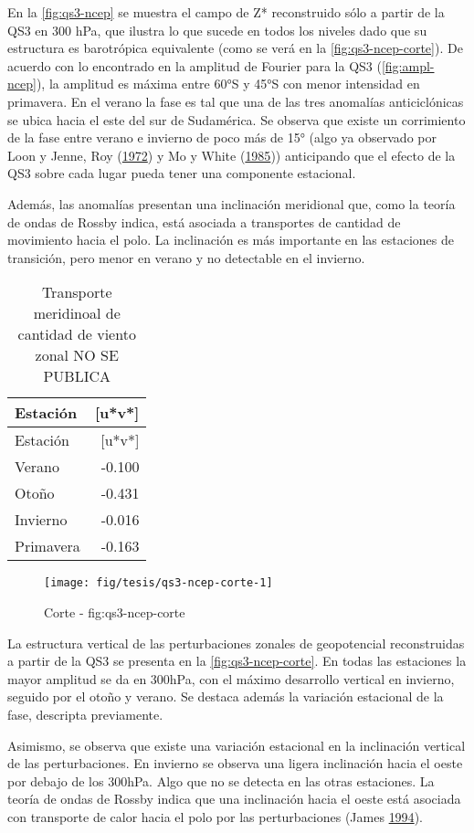 \documentclass[spanish,a4paper]{book}
\begin{document}
En la \autoref{fig:qs3-ncep} se muestra el campo de Z* reconstruido sólo
a partir de la QS3 en 300 hPa, que ilustra lo que sucede en todos los
niveles dado que su estructura es barotrópica equivalente (como se verá
en la \autoref{fig:qs3-ncep-corte}). De acuerdo con lo encontrado en la
amplitud de Fourier para la QS3 (\autoref{fig:ampl-ncep}), la amplitud
es máxima entre 60°S y 45°S con menor intensidad en primavera. En el
verano la fase es tal que una de las tres anomalías anticiclónicas se
ubica hacia el este del sur de Sudamérica. Se observa que existe un
corrimiento de la fase entre verano e invierno de poco más de 15° (algo
ya observado por Loon y Jenne, Roy
(\protect\hyperlink{ref-Loon1972}{1972}) y Mo y White
(\protect\hyperlink{ref-Mo1985}{1985})) anticipando que el efecto de la
QS3 sobre cada lugar pueda tener una componente estacional.

Además, las anomalías presentan una inclinación meridional que, como la
teoría de ondas de Rossby indica, está asociada a transportes de
cantidad de movimiento hacia el polo. La inclinación es más importante
en las estaciones de transición, pero menor en verano y no detectable en
el invierno.

\begin{longtable}[]{@{}lr@{}}
\caption{Transporte meridinoal de cantidad de viento zonal NO SE
PUBLICA}\tabularnewline
\toprule
Estación & {[}u*v*{]}\tabularnewline
\midrule
\endfirsthead
\toprule
Estación & {[}u*v*{]}\tabularnewline
\midrule
\endhead
Verano & -0.100\tabularnewline
Otoño & -0.431\tabularnewline
Invierno & -0.016\tabularnewline
Primavera & -0.163\tabularnewline
\bottomrule
\end{longtable}

\begin{figure*}
\texttt{[image: fig/tesis/qs3-ncep-corte-1]} \caption{Corte - fig:qs3-ncep-corte}\label{fig:qs3-ncep-corte}
\end{figure*}

La estructura vertical de las perturbaciones zonales de geopotencial
reconstruidas a partir de la QS3 se presenta en la
\autoref{fig:qs3-ncep-corte}. En todas las estaciones la mayor amplitud
se da en 300hPa, con el máximo desarrollo vertical en invierno, seguido
por el otoño y verano. Se destaca además la variación estacional de la
fase, descripta previamente.

Asimismo, se observa que existe una variación estacional en la
inclinación vertical de las perturbaciones. En invierno se observa una
ligera inclinación hacia el oeste por debajo de los 300hPa. Algo que no
se detecta en las otras estaciones. La teoría de ondas de Rossby indica
que una inclinación hacia el oeste está asociada con transporte de calor
hacia el polo por las perturbaciones (James
\protect\hyperlink{ref-James}{1994}).
\end{document}
